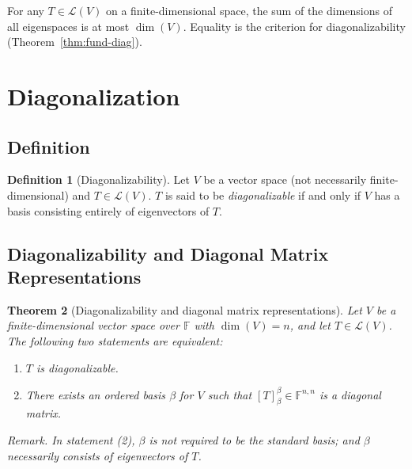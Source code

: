 \documentclass[11pt, a4paper, notitlepage]{report}
\newtheorem{theorem}{Theorem}[section]
\theoremstyle{definition}
\newtheorem{definition}[theorem]{Definition}
\theoremstyle{remark}
\begin{document}
\begin{keyresult}[title={Key Result: Eigenspace Dimension Bound}]
For any $T \in \mathcal{L}(V)$ on a finite-dimensional space,
the sum of the dimensions of all eigenspaces is at most $\dim(V)$.
Equality is the criterion for diagonalizability (Theorem~\ref{thm:fund-diag}).
\end{keyresult}

\section{Diagonalization}
\label{sec:diagonalization}

\subsection{Definition}

\begin{definition}[Diagonalizability]
\label{def:diagonalizable}
Let $V$ be a vector space (not necessarily finite-dimensional) and $T \in \mathcal{L}(V)$.
$T$ is said to be \emph{diagonalizable} if and only if $V$ has a basis consisting entirely of
eigenvectors of $T$.
\end{definition}

\subsection{Diagonalizability and Diagonal Matrix Representations}

\begin{theorem}[Diagonalizability and diagonal matrix representations]
\label{thm:diag-matrix-rep}
Let $V$ be a finite-dimensional vector space over $\mathbb{F}$ with $\dim(V) = n$, and let
$T \in \mathcal{L}(V)$. The following two statements are equivalent:
\begin{enumerate}
  \item $T$ is diagonalizable.
  \item There exists an ordered basis $\beta$ for $V$ such that
        $[T]_\beta^\beta \in \mathbb{F}^{n,n}$ is a diagonal matrix.
\end{enumerate}
\emph{Remark.} In statement (2), $\beta$ is not required to be the standard basis; and $\beta$
necessarily consists of eigenvectors of $T$.
\end{theorem}
\end{document}
